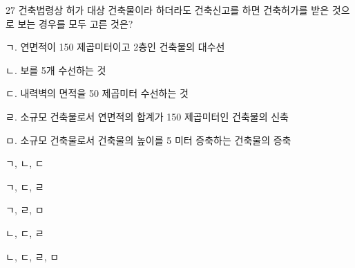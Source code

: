 \begin{question}{27}
건축법령상 허가 대상 건축물이라 하더라도 건축신고를 하면 건축허가를 받은 것으로 보는 경우를 모두 고른 것은?
\begin{framedtext}
ㄱ. 연면적이 150 제곱미터이고 2층인 건축물의 대수선 \par
ㄴ. 보를 5개 수선하는 것 \par
ㄷ. 내력벽의 면적을 50 제곱미터 수선하는 것 \par
ㄹ. 소규모 건축물로서 연면적의 합계가 150 제곱미터인 건축물의 신축 \par
ㅁ. 소규모 건축물로서 건축물의 높이를 5 미터 증축하는 건축물의 증축
\end{framedtext}
\begin{choices}
  \item ㄱ, ㄴ, ㄷ
  \item ㄱ, ㄷ, ㄹ
  \item ㄱ, ㄹ, ㅁ
  \item ㄴ, ㄷ, ㄹ
  \item ㄴ, ㄷ, ㄹ, ㅁ
\end{choices}
\end{question}
